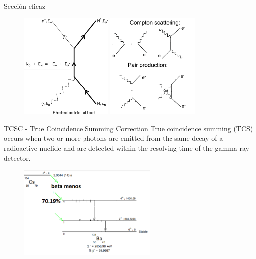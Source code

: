 \documentclass[9pt]{beamer}
\begin{document}
\begin{frame}[noframenumbering, label=SeccionEficaz]{Sección eficaz}
\begin{figure}
\includegraphics[width=0.4\textwidth]{Imagenes/FeymannPhotoelectric.png}
\includegraphics[width=0.4\textwidth]{Imagenes/FeymannCompton.png}
\end{figure}
	\begin{flushright}
	\hyperlink{Portada}{}
	\end{flushright}
\end{frame}

\begin{frame}[noframenumbering, label=TCSC]{TCSC - True Coincidence Summing Correction}
\justifying True coincidence summing (TCS) occurs when two or more photons are emitted from the same decay of a radioactive nuclide and are detected within the resolving time of the gamma ray detector.
\begin{figure}
\includegraphics[width=0.6\textwidth]{Imagenes/134Cs.png}
\end{figure}
	\begin{flushright}
	\hyperlink{Portada}{\beamerbutton{Portada}}
	\end{flushright}
\end{frame}
\end{document}

